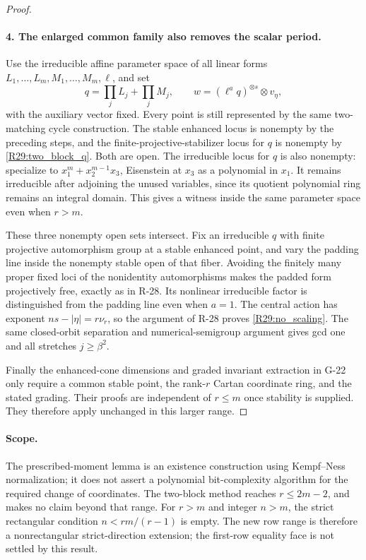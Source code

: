 \begin{proof}
\paragraph{4. The enlarged common family also removes the scalar period.}
Use the irreducible affine parameter space of all linear
forms $L_1,\ldots,L_m,M_1,\ldots,M_m,\ell$, and set
\[
 q=\prod_jL_j+\prod_jM_j,\qquad
 w=(\ell^a q)^{\otimes s}\otimes v_\eta,
\]
with the auxiliary vector fixed. Every point is still
represented by the same two-matching cycle construction.
The stable enhanced locus is nonempty by the preceding
steps, and the finite-projective-stabilizer locus for $q$
is nonempty by \eqref{R29:two_block_q}. Both are open.
The irreducible locus for $q$ is also nonempty: specialize
to $x_1^m+x_2^{m-1}x_3$, Eisenstein at $x_3$ as a
polynomial in $x_1$. It remains irreducible after adjoining
the unused variables, since its quotient polynomial ring
remains an integral domain. This gives a witness inside
the same parameter space even when $r>m$.

These three nonempty open sets intersect. Fix an
irreducible $q$ with finite projective automorphism group
at a stable enhanced point, and vary the padding line
inside the nonempty stable open of that fiber. Avoiding
the finitely many proper fixed loci of the nonidentity
automorphisms makes the padded form projectively free,
exactly as in R-28. Its nonlinear irreducible factor is
distinguished from the padding line even when $a=1$.
The central action has exponent $ns-|\eta|=r\nu_r$,
so the argument of R-28 proves \eqref{R29:no_scaling}.
The same closed-orbit separation and numerical-semigroup
argument gives gcd one and all stretches $j\geq\beta^2$.

Finally the enhanced-cone dimensions and graded invariant
extraction in G-22 only require a common stable point,
the rank-$r$ Cartan coordinate ring, and the stated grading.
Their proofs are independent of $r\leq m$ once stability
is supplied. They therefore apply unchanged in this
larger range.
\end{proof}

\paragraph{Scope.}
The prescribed-moment lemma is an existence construction
using Kempf--Ness normalization; it does not assert a
polynomial bit-complexity algorithm for the required
change of coordinates. The two-block method reaches
$r\leq2m-2$, and makes no claim beyond that range.
For $r>m$ and integer $n>m$, the strict rectangular
condition $n<rm/(r-1)$ is empty. The new row range is
therefore a nonrectangular strict-direction extension;
the first-row equality face is not settled by this result.


